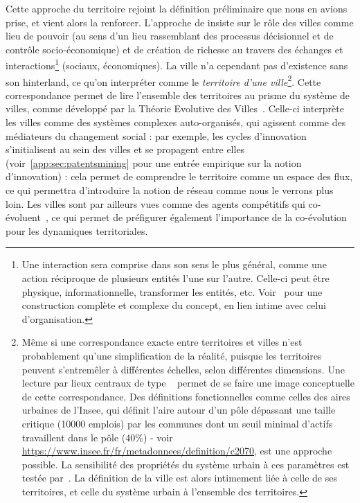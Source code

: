 {Cette approche du territoire rejoint la définition préliminaire que nous en avions prise, et vient alors la renforcer. L'approche de  insiste sur le rôle des villes comme lieu de pouvoir (au sens d'un lieu rassemblant des processus décisionnel et de contrôle socio-économique) et de création de richesse au travers des échanges et interactions\footnote{Une interaction sera comprise dans son sens le plus général, comme une action réciproque de plusieurs entités l'une sur l'autre. Celle-ci peut être physique, informationnelle, transformer les entités, etc. Voir~\cite{morin1976methode} pour une construction complète et complexe du concept, en lien intime avec celui d'organisation.} (sociaux, économiques). La ville n'a cependant pas d'existence sans son hinterland, ce qu'on interpréter comme le \emph{territoire d'une ville}\footnote{Même si une correspondance exacte entre territoires et villes n'est probablement qu'une simplification de la réalité, puisque les territoires peuvent s'entremêler à différentes échelles, selon différentes dimensions. Une lecture par lieux centraux de type ~\cite{banos2011christaller} permet de se faire une image conceptuelle de cette correspondance. Des définitions fonctionnelles comme celles des aires urbaines de l'Insee, qui définit l'aire autour d'un pôle dépassant une taille critique (10000 emplois) par les communes dont un seuil minimal d'actifs travaillent dans le pôle (40\%) - voir \url{https://www.insee.fr/fr/metadonnees/definition/c2070}, est une approche possible. La sensibilité des propriétés du système urbain à ces paramètres est testée par~\cite{2015arXiv150707878C}. La définition de la ville est alors intimement liée à celle de ses territoires, et celle du système urbain à l'ensemble des territoires.}. Cette correspondance permet de lire l'ensemble des territoires au prisme du système de villes, comme développé par la Théorie Evolutive des Villes~\cite{pumain2010theorie}. Celle-ci interprète les villes comme des systèmes complexes auto-organisés, qui agissent comme des médiateurs du changement social : par exemple, les cycles d'innovation s'initialisent au sein des villes et se propagent entre elles (voir~\ref{app:sec:patentsmining} pour une entrée empirique sur la notion d'innovation) : cela permet de comprendre le territoire comme un espace des flux, ce qui permettra d'introduire la notion de réseau comme nous le verrons plus loin. Les villes sont par ailleurs vues comme des agents compétitifs qui co-évoluent~\cite{paulus2004coevolution}, ce qui permet de préfigurer également l'importance de la co-évolution pour les dynamiques territoriales.
}



